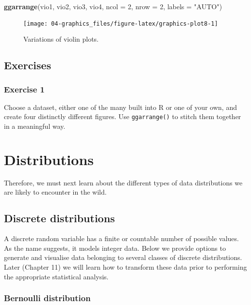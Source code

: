 \documentclass[english,10pt,a4paper,oneside]{book}
\newenvironment{Shaded}{\begin{snugshade}}{\end{snugshade}}
\newcommand{\DataTypeTok}[1]{\textcolor[rgb]{0.13,0.29,0.53}{#1}}
\newcommand{\DecValTok}[1]{\textcolor[rgb]{0.00,0.00,0.81}{#1}}
\newcommand{\KeywordTok}[1]{\textcolor[rgb]{0.13,0.29,0.53}{\textbf{#1}}}
\newcommand{\NormalTok}[1]{#1}
\newcommand{\StringTok}[1]{\textcolor[rgb]{0.31,0.60,0.02}{#1}}
\theoremstyle{definition}
\theoremstyle{definition}
\theoremstyle{definition}
\theoremstyle{remark}
\begin{document}
\begin{Shaded}
\begin{Highlighting}[]
\KeywordTok{ggarrange}\NormalTok{(vio1, vio2, vio3, vio4, }\DataTypeTok{ncol =} \DecValTok{2}\NormalTok{, }\DataTypeTok{nrow =} \DecValTok{2}\NormalTok{, }\DataTypeTok{labels =} \StringTok{"AUTO"}\NormalTok{)}
\end{Highlighting}
\end{Shaded}

\begin{figure}
\texttt{[image: 04-graphics\_files/figure-latex/graphics-plot8-1]} \caption{Variations of violin plots.}\label{fig:graphics-plot8}
\end{figure}

\hypertarget{exercises-1}{%
\section{Exercises}\label{exercises-1}}

\hypertarget{exercise-1-1}{%
\subsection{Exercise 1}\label{exercise-1-1}}

Choose a dataset, either one of the many built into R or one of your
own, and create four distinctly different figures. Use
\texttt{ggarrange()} to stitch them together in a meaningful way.

\hypertarget{distributions}{%
\chapter{Distributions}\label{distributions}}

Therefore, we must next learn about the different types of data
distributions we are likely to encounter in the wild.

\hypertarget{discrete-distributions}{%
\section{Discrete distributions}\label{discrete-distributions}}

A discrete random variable has a finite or countable number of possible
values. As the name suggests, it models integer data. Below we provide
options to generate and visualise data belonging to several classes of
discrete distributions. Later (Chapter 11) we will learn how to
transform these data prior to performing the appropriate statistical
analysis.

\hypertarget{bernoulli-distribution}{%
\subsection{Bernoulli distribution}\label{bernoulli-distribution}}
\end{document}
